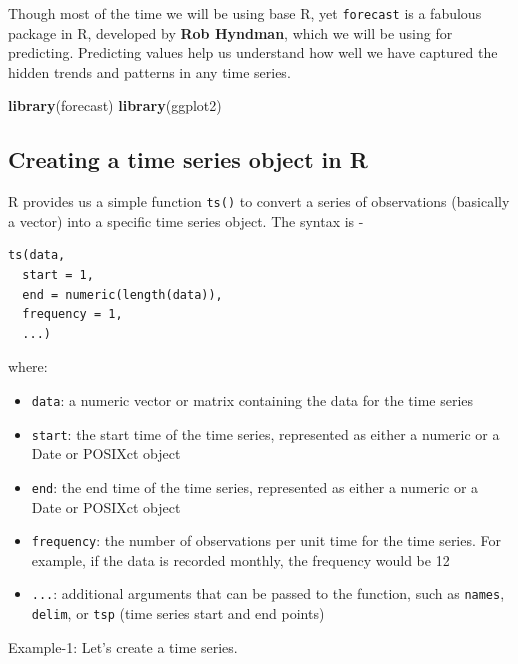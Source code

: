 \documentclass[
]{book}
\newenvironment{Shaded}{\begin{snugshade}}{\end{snugshade}}
\newcommand{\FunctionTok}[1]{\textcolor[rgb]{0.13,0.29,0.53}{\textbf{#1}}}
\newcommand{\NormalTok}[1]{#1}
\providecommand{\tightlist}{%
  \setlength{\itemsep}{0pt}\setlength{\parskip}{0pt}}
\begin{document}
Though most of the time we will be using base R, yet \texttt{forecast} is a fabulous package in R, developed by \textbf{Rob Hyndman}, which we will be using for predicting. Predicting values help us understand how well we have captured the hidden trends and patterns in any time series.

\begin{Shaded}
\begin{Highlighting}[]
\FunctionTok{library}\NormalTok{(forecast)}
\FunctionTok{library}\NormalTok{(ggplot2)}
\end{Highlighting}
\end{Shaded}

\hypertarget{creating-a-time-series-object-in-r}{%
\subsection{Creating a time series object in R}\label{creating-a-time-series-object-in-r}}

R provides us a simple function \texttt{ts()} to convert a series of observations (basically a vector) into a specific time series object. The syntax is -

\begin{verbatim}
ts(data, 
  start = 1, 
  end = numeric(length(data)), 
  frequency = 1, 
  ...)
\end{verbatim}

where:

\begin{itemize}
\tightlist
\item
  \texttt{data}: a numeric vector or matrix containing the data for the time series
\item
  \texttt{start}: the start time of the time series, represented as either a numeric or a Date or POSIXct object
\item
  \texttt{end}: the end time of the time series, represented as either a numeric or a Date or POSIXct object
\item
  \texttt{frequency}: the number of observations per unit time for the time series. For example, if the data is recorded monthly, the frequency would be 12
\item
  \texttt{...}: additional arguments that can be passed to the function, such as \texttt{names}, \texttt{delim}, or \texttt{tsp} (time series start and end points)
\end{itemize}

Example-1: Let's create a time series.
\end{document}
